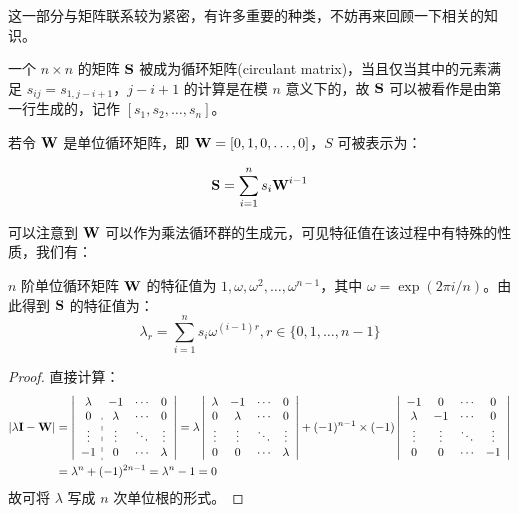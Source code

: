 这一部分与矩阵联系较为紧密，有许多重要的种类，不妨再来回顾一下相关的知识。

\begin{definition}[循环矩阵]
一个 $n\times n$ 的矩阵 $\textbf S$ 被成为循环矩阵(circulant matrix)，当且仅当其中的元素满足 $s_{ij} = s_{1,j-i+1}$，$j-i+1$ 的计算是在模 $n$ 意义下的，故 $\textbf S$ 可以被看作是由第一行生成的，记作 $[s_1, s_2, \dots, s_n]$。

若令 $\textbf W$ 是单位循环矩阵，即 $\textbf W = [0,1,0,\dots,0]$，$S$ 可被表示为：

\[
\textbf S = \sum_{i = 1}^n s_i \textbf W^{i - 1}
\]
\end{definition}

可以注意到 $\textbf W$ 可以作为乘法循环群的生成元，可见特征值在该过程中有特殊的性质，我们有：

\begin{proposition}
$n$ 阶单位循环矩阵 $\textbf W$ 的特征值为 $1, \omega, \omega^2, \dots, \omega^{n - 1}$，其中 $\omega = \exp(2\pi i / n)$。由此得到 $\textbf S$ 的特征值为：
\[
\lambda_r = \sum_{i = 1}^n s_i \omega^{(i - 1)r}, r\in\{0, 1, \dots, n - 1\}
\]
\end{proposition}
\begin{proof}
直接计算：
\[
\begin{aligned}
|\lambda\textbf I - \textbf W| & = \left|
\begin{array}{c:ccc}
  \lambda & -1 & \cdots & 0 \\  
  0 & \lambda & \cdots & 0 \\  
  \vdots & \vdots & \ddots & \vdots \\  
  -1 & 0 & \cdots & \lambda  
\end{array}
\right| = \lambda \left|
\begin{array}{cccc}
  \lambda & -1 & \cdots & 0 \\  
  0 & \lambda & \cdots & 0 \\  
  \vdots & \vdots & \ddots & \vdots \\  
  0 & 0 & \cdots & \lambda  
\end{array}
\right|
+
(-1)^{n-1}\times (-1)\left|
\begin{array}{cccc}
  -1 & 0 & \cdots & 0 \\  
  \lambda & -1 & \cdots & 0 \\  
  \vdots & \vdots & \ddots & \vdots \\  
  0 & 0 & \cdots & -1 
\end{array}
\right|
\\
& = \lambda^n + (-1)^{2n-1}=\lambda^n - 1 = 0
\end{aligned}
\]
故可将 $\lambda$ 写成 $n$ 次单位根的形式。
\end{proof}

